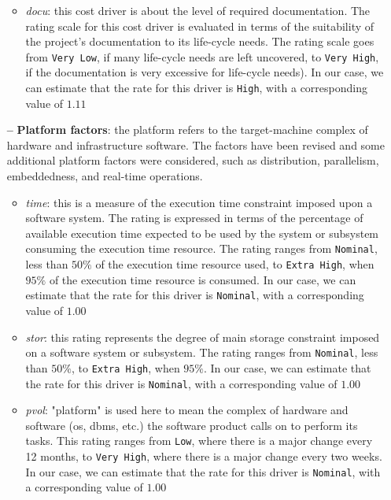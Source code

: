 \begin{itemize}
\begin{itemize}
	\item \textit{\acl{docu}}: this cost driver is about the level of required documentation. The rating scale for this cost driver is evaluated in terms of the suitability of the project's documentation to its life-cycle needs. The rating scale goes from \texttt{Very Low}, if many life-cycle needs are left uncovered, to \texttt{Very High}, if the documentation is very excessive for life-cycle needs). In our case, we can estimate that the rate for this driver is \texttt{High}, with a corresponding value of $1.11$
	
	\end{itemize}
	
\item[\textbf{--}] \textbf{Platform factors}: the platform refers to the target-machine complex of hardware and infrastructure software. The factors have been revised and some additional platform factors were considered, such as distribution, parallelism, embeddedness, and real-time operations.

	\begin{itemize}
	
	\item \textit{\acl{time}}: this is a measure of the execution time constraint imposed upon a software system. The rating is expressed in terms of the percentage of available execution time expected to be used by the system or subsystem consuming the execution time resource. The rating ranges from \texttt{Nominal}, less than $50\%$ of the execution time resource used, to \texttt{Extra High}, when $95\%$ of the execution time resource is consumed. In our case, we can estimate that the rate for this driver is \texttt{Nominal}, with a corresponding value of $1.00$
	
	\item \textit{\acl{stor}}: this rating represents the degree of main storage constraint imposed on a software system or subsystem. The rating ranges from \texttt{Nominal}, less than $50\%$, to \texttt{Extra High}, when  $95\%$. In our case, we can estimate that the rate for this driver is \texttt{Nominal}, with a corresponding value of $1.00$
	
	\item \textit{\acl{pvol}}: "platform" is used here to mean the complex of hardware and software (\acs{os}, \acs{dbms}, etc.) the software product calls on to perform its tasks. This rating ranges from \texttt{Low}, where there is a major change every 12 months, to \texttt{Very High}, where there is a major change every two weeks. In our case, we can estimate that the rate for this driver is \texttt{Nominal}, with a corresponding value of $1.00$
	

\end{itemize}
\end{itemize}
